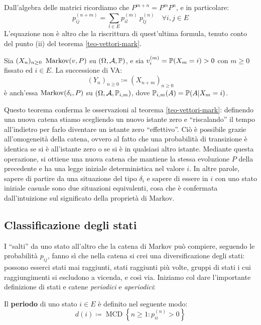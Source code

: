 \begin{dimo}
	Dall'algebra delle matrici ricordiamo che $P^{m+n} = P^m P^n$, e in particolare:
	$$p_{ij}^{(n+m)} = \sum_{l \in E} p_{il}^{(m)} \ p_{lj}^{(n)} \quad \forall i,j \in E$$
	L'equazione non è altro che la riscrittura di quest'ultima formula, tenuto conto del punto (ii) del teorema \ref{teo-vettori-mark}.
\end{dimo}

\begin{teo}\label{teo-time-scaling}
	Sia $(X_n)_{n \ge 0} \ \operatorname{Markov}(v,P)$ su $(\Omega, \mathcal A, \mathbb P)$, e sia $v_i^{(m)} = \mathbb P(X_m=i) > 0$ con $m \ge 0$ fissato ed $i \in E$.
	La successione di VA:
	$$(Y_n)_{n \ge 0} \coloneqq (X_{n+m})_{n \ge 0}$$
	è anch'essa $\operatorname{Markov}(\delta_i,P)$ su $(\Omega,\mathcal A,\mathbb P_{i,m})$, dove $\mathbb P_{i,m}(A) = \mathbb P(A|X_m=i)$.
\end{teo}
Questo teorema conferma le osservazioni al teorema \ref{teo-vettori-mark}: definendo una nuova catena stiamo scegliendo un nuovo istante zero e ``riscalando'' il tempo all'indietro per farlo diventare un istante zero ``effettivo''.
Ciò è possibile grazie all'omogeneità della catena, ovvero al fatto che una probabilità di transizione è identica se si è all'istante zero o se si è in qualsiasi altro istante.
Mediante questa operazione, si ottiene una nuova catena che mantiene la stessa evoluzione $P$ della precedente e ha una legge iniziale deterministica nel valore $i$.
In altre parole, sapere di partire da una situazione del tipo $\delta_i$ e sapere di essere in $i$ con uno stato iniziale casuale sono due situazioni equivalenti, cosa che è confermata dall'intuizione sul significato della proprietà di Markov.

\subsection{Classificazione degli stati}

I ``salti'' da uno stato all'altro che la catena di Markov può compiere, seguendo le probabilità $p_{ij}$,
fanno sì che nella catena si crei una diversificazione degli stati: possono esserci stati mai raggiunti,
stati raggiunti più volte, gruppi di stati i cui raggiungimenti si escludono a vicenda, e così via.
Iniziamo col dare l'importante definizione di stati e catene \emph{periodici} e \emph{aperiodici}: \\

\begin{defn}\label{def-periodo}
	Il \textbf{periodo} di uno stato $i \in E$ è definito nel seguente modo:
	$$ d(i) \coloneqq \operatorname{MCD} \left \{ n \ge 1 : p_{ii}^{(n)} > 0 \right \}$$
\end{defn}

